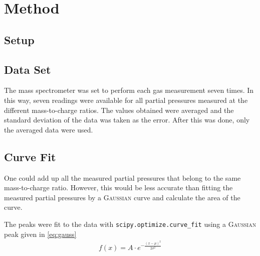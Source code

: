 \newpage
\section{Method} \label{sec:method}
\subsection{Setup}
\subsection{Data Set}
The mass spectrometer was set to perform each gas measurement seven times. In this way, seven readings were available for all partial pressures measured at the different mass-to-charge ratios. The values obtained were averaged and the standard deviation of the data was taken as the error. After this was done, only the averaged data were used. 

\subsection{Curve Fit}
\label{sec:fit}
One could add up all the measured partial pressures that belong to the same mass-to-charge ratio. However, this would be less accurate than fitting the measured partial pressures by a {\scshape Gaussian} curve and calculate the area of the curve. 

The peaks were fit to the data with \texttt{scipy.optimize.curve\_fit}\cite{scipy} using a {\scshape Gaussian} peak given in \eqref{eq:gauss}
\begin{align}
    f(x) = A\cdot e^{-\frac{(x-\mu)^2}{2\sigma^2}} \label{eq:gauss}
\end{align}

